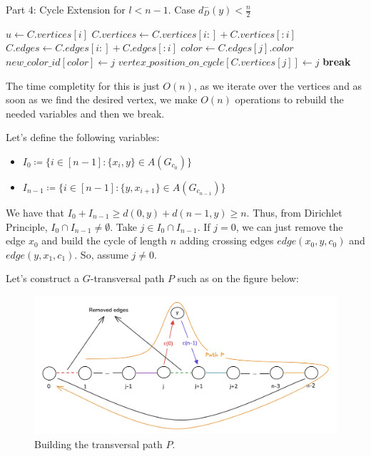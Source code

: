 \begin{algorithm}[H]
    \caption{Part 4: Cycle Extension for \( l < n - 1 \). Case \( d^-_D(y) < \frac{n}{2} \)}
    \begin{algorithmic}[1]
                \State $u \gets C.vertices[i]$
                    \State $C.vertices \gets C.vertices[i:] + C.vertices[:i]$
                    \State $C.edges \gets C.edges[i:] + C.edges[:i]$
                \EndIf
                    \State $color \gets C.edges[j].color$
                    \State $new\_color\_id[color] \gets j$
                    \State $vertex\_position\_on\_cycle[C.vertices[j]] \gets j$
                \EndFor
                \State \textbf{break}
            \EndFor
        \EndFunction
    \end{algorithmic}
\end{algorithm}

The time completity for this is just $O(n)$, as we iterate over the vertices and
as soon as we find the desired vertex, we make $O(n)$ operations to rebuild the needed variables and then we break.

Let's define the following variables:

\begin{itemize}
    \item $I_0 \coloneqq \{i \in [n - 1]: \{x_i, y\} \in A(G_{c_0})\}$
    \item $I_{n-1} \coloneqq \{i \in [n - 1]: \{y, x_{i+1}\} \in A(G_{c_{n-1}})\}$
\end{itemize}

We have that $I_0 + I_{n-1} \geq d(0, y) + d(n-1, y) \geq n$. Thus, 
from Dirichlet Principle, $I_0 \cap I_{n-1} \neq \emptyset$. Take $j \in I_0 \cap I_{n-1}$.
If $j = 0$, we can just remove the edge $x_0$ and build the cycle of length $n$ 
adding crossing edges $edge(x_0, y, c_0)$ and $edge(y, x_1, c_1)$. So, assume $j \neq 0$.

Let's construct a $G$-transversal path $P$ such as on the figure below:

\begin{figure}[H]
    \centering
    \includegraphics[width=1\textwidth]{figuras/cycle_n-1_build_path.png}
    \caption{Building the transversal path $P$.}
    \label{fig:cycle_n-1_build_path}
\end{figure}

